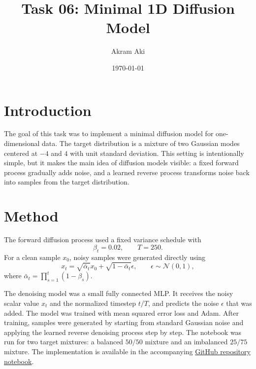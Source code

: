 

\title{Task 06: Minimal 1D Diffusion Model}
\author{Akram Aki}
\date{\today}



\maketitle

\section{Introduction}

The goal of this task was to implement a minimal diffusion model for one-dimensional data.
The target distribution is a mixture of two Gaussian modes centered at $-4$ and $4$ with unit standard deviation.
This setting is intentionally simple, but it makes the main idea of diffusion models visible: a fixed forward process gradually adds noise, and a learned reverse process transforms noise back into samples from the target distribution.

\section{Method}

The forward diffusion process used a fixed variance schedule with
\begin{equation*}
    \beta_t = 0.02, \qquad T = 250.
\end{equation*}
For a clean sample $x_0$, noisy samples were generated directly using
\begin{equation*}
    x_t = \sqrt{\bar{\alpha}_t} x_0 + \sqrt{1 - \bar{\alpha}_t}\epsilon,
    \qquad \epsilon \sim \mathcal{N}(0, 1),
\end{equation*}
where $\bar{\alpha}_t = \prod_{s=1}^{t}(1-\beta_s)$.

The denoising model was a small fully connected MLP. It receives the noisy scalar value $x_t$ and the normalized timestep $t/T$, and predicts the noise $\epsilon$ that was added.
The model was trained with mean squared error loss and Adam.
After training, samples were generated by starting from standard Gaussian noise and applying the learned reverse denoising process step by step.
The notebook was run for two target mixtures: a balanced $50/50$ mixture and an imbalanced $25/75$ mixture.
The implementation is available in the accompanying \href{https://github.com/AkramAki/Advanced_DeepLearning_Seminar/tree/main/tasks/task_06/code/task_06.ipynb}{GitHub repository notebook}.

